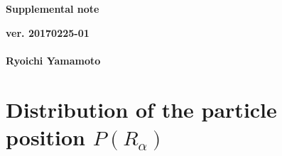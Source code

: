 \documentclass[a4paper,11pt]{article}
\begin{document}
\begin{center}
  {\LARGE\bf Supplemental note}
  \end{center}
\begin{flushright}
  {\large\bf ver. 20170225-01}\\
 \ \\
{\large\bf Ryoichi Yamamoto}\\
\end{flushright}

\section{Distribution of the particle position $P(R_\alpha)$}
\end{document}
